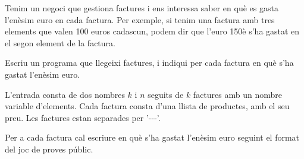 

\Statement

Tenim un negoci que gestiona factures i ens interessa saber en què es gasta l'enèsim euro en cada factura. Per exemple, si tenim una factura amb tres elements que valen 100 euros cadascun, podem dir que l'euro 150è s'ha gastat en el segon element de la factura.

\medskip

Escriu un programa que llegeixi factures, i indiqui per cada factura en què s'ha gastat l'enèsim euro.

\Input

L'entrada consta de dos nombres $k$ i $n$ seguits de $k$ factures amb un nombre variable d'elements. Cada factura consta d'una llista de productes, amb el seu preu. Les factures estan separades per '-{}-{}-'.

\Output

Per a cada factura cal escriure en què s'ha gastat l'enèsim euro seguint el format del joc de proves públic.


\SampleOneCol
